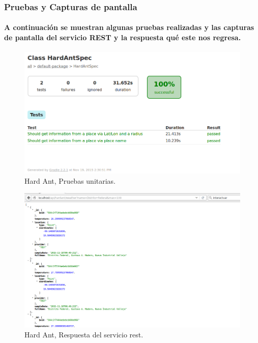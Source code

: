   \subsubsection{Pruebas y Capturas de pantalla}
    \paragraph{A continuación se muestran algunas pruebas realizadas y las capturas de pantalla del servicio REST y la respuesta qué este nos regresa.}
      \begin{figure}[h!]
        \centering
          \includegraphics[width=\textwidth]{./images/PruebasHardAnt}
          \caption{Hard Ant, Pruebas unitarias.}
      \end{figure}
      \begin{figure}[h!]
        \centering
          \includegraphics[width=\textwidth]{./images/CapturaHardAnt}
          \caption{Hard Ant, Respuesta del servicio rest.}
      \end{figure}